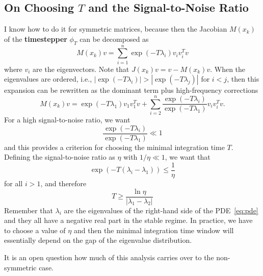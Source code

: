 \documentclass{article}
\begin{document}
\subsection{On Choosing $T$ and the Signal-to-Noise Ratio}
I know how to do it for symmetric matrices, because then the Jacobian $M(x_k)$ of the \textbf{timestepper} $\phi_T$ can be decomposed as
\begin{equation}
    M(x_k) v = \sum_{i=1}^n \exp(-T \lambda_i) v_i v_i^T v
\end{equation}
where $v_i$ are the eigenvectors. Note that $J(x_k) v = v - M(x_k)v$. When the eigenvalues are ordered, i.e., $|\exp(-T \lambda_i)| > |\exp(-T \lambda_j)|$ for $i < j$, then this expansion can be rewritten as the dominant term plus high-frequency corrections
\begin{equation}
    M(x_k) v =  \exp(-T \lambda_1)v_1 v_1^T v + \sum_{i=2}^n \frac{\exp(-T \lambda_i)}{ \exp(-T \lambda_1)}v_i v_i^T v.
\end{equation}
For a high signal-to-noise ratio, we want 
\begin{equation}
    \frac{\exp(-T \lambda_i)}{\exp(-T \lambda_1)} \ll 1
\end{equation}
and this provides a criterion for choosing the minimal integration time $T$. Defining the signal-to-noise ratio as $\eta$ with $1/\eta \ll 1$, we want that
\begin{equation*}
    \exp\left(-T(\lambda_i - \lambda_1)\right) \leq \frac{1}{\eta}
\end{equation*}
 for all $i > 1$, and therefore
\begin{equation}
    T \geq \frac{\ln \eta}{|\lambda_1 - \lambda_2|}
\end{equation}
Remember that $\lambda_i$ are the eigenvalues of the right-hand side of the PDE~\eqref{eq:pde} and they all have a negative real part in the stable regime. In practice, we have to choose a value of $\eta$ and then the minimal integration time window will essentially depend on the gap of the eigenvalue distribution.

It is an open question how much of this analysis carries over to the non-symmetric case.
\end{document}
